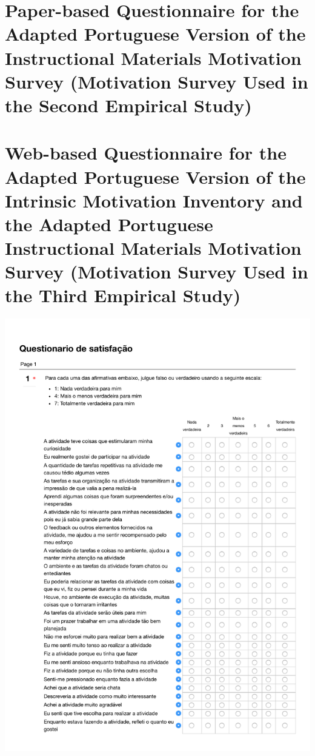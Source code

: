 \newpage
\section[Paper-based Questionnaire for the Adapted Portuguese IMMS]{Paper-based Questionnaire for the Adapted Portuguese Version of the Instructional Materials Motivation Survey (Motivation Survey Used in the Second Empirical Study)}
\label{annex:IMMS-second-study}

\newpage
\section[Web-based Questionnaire for the Adapted Portuguese Version of IMI and IMMS]{Web-based Questionnaire for the Adapted Portuguese Version of the Intrinsic Motivation Inventory and the Adapted Portuguese Instructional Materials Motivation Survey (Motivation Survey Used in the Third Empirical Study)}
\label{annex:IMI-IMMS-third-study}
\includegraphics[width=1\textwidth]{images/annex/IMI-IMMS-third-study-01.pdf}
